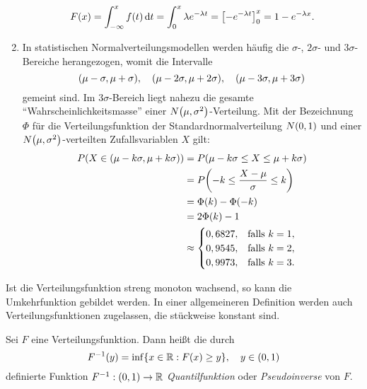 \documentclass{lecture}
\begin{document}
\begin{example}
\begin{enumerate}
            \[
                F\parentheses*{x} = \int_{-\infty}^x f\parentheses*{t}\d t = \int_0^x \lambda e^{-\lambda t} = \brackets*{-e^{-\lambda t}}_0^x = 1 - e^{-\lambda x}.
            \]
            \item In statistischen Normalverteilungsmodellen werden häufig die \(\sigma\)-, \(2\sigma\)- und \(3\sigma\)-Bereiche herangezogen, womit die Intervalle
            \[
                \parentheses*{\mu - \sigma, \mu + \sigma}, \quad \parentheses*{\mu - 2\sigma, \mu + 2\sigma}, \quad \parentheses*{\mu - 3\sigma, \mu + 3\sigma}
            \]
            gemeint sind.
            Im \(3\sigma\)-Bereich liegt nahezu die gesamte ``Wahrscheinlichkeitsmasse'' einer \(N\parentheses*{\mu, \sigma^2}\)-Verteilung.
            Mit der Bezeichnung \(\Phi\) für die Verteilungsfunktion der Standardnormalverteilung \(N\parentheses*{0, 1}\) und einer \(N\parentheses*{\mu, \sigma^2}\)-verteilten Zufallsvariablen \(X\) gilt:
            \begin{align*}
                P\parentheses*{X \in \parentheses*{\mu - k\sigma, \mu + k\sigma}} &= P\parentheses*{\mu - k\sigma \le X \le \mu + k\sigma}\\
                &= P\parentheses*{-k \le \frac{X - \mu}{\sigma} \le k}\\
                &= \Phi\parentheses*{k} - \Phi\parentheses*{-k}\\
                &= 2\Phi\parentheses*{k} - 1\\
                &\approx \begin{cases}
                    0,6827, & \text{falls }k = 1,\\
                    0,9545, & \text{falls }k = 2,\\
                    0,9973, & \text{falls }k = 3.
                \end{cases}
            \end{align*}
        \end{enumerate}
    \end{example}

    Ist die Verteilungsfunktion streng monoton wachsend, so kann die Umkehrfunktion gebildet werden.
    In einer allgemeineren Definition werden auch Verteilungsfunktionen zugelassen, die stückweise konstant sind.

    \begin{definition}
        Sei \(F\) eine Verteilungsfunktion.
        Dann heißt die durch
        \[
            F^{-1}\parentheses*{y} = \inf\braces*{x \in \R : F\parentheses*{x} \ge y}, \quad y \in \parentheses*{0, 1}
        \]
        definierte Funktion \(F^{-1}: \parentheses*{0, 1} \to \R\) \emph{Quantilfunktion} oder \emph{Pseudoinverse} von \(F\).
    \end{definition}
\end{document}
